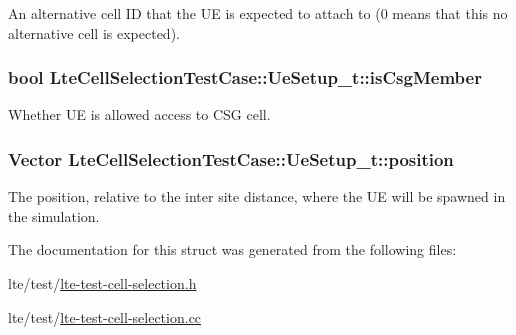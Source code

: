 An alternative cell ID that the UE is expected to attach to (0 means that this no alternative cell is expected). 

\subsubsection[{\texorpdfstring{is\+Csg\+Member}{isCsgMember}}]{\setlength{\rightskip}{0pt plus 5cm}bool Lte\+Cell\+Selection\+Test\+Case\+::\+Ue\+Setup\+\_\+t\+::is\+Csg\+Member}\hypertarget{structLteCellSelectionTestCase_1_1UeSetup__t_a86d14f555665658a506313e5e7613267}{}\label{structLteCellSelectionTestCase_1_1UeSetup__t_a86d14f555665658a506313e5e7613267}


Whether UE is allowed access to C\+SG cell. 

\subsubsection[{\texorpdfstring{position}{position}}]{\setlength{\rightskip}{0pt plus 5cm}Vector Lte\+Cell\+Selection\+Test\+Case\+::\+Ue\+Setup\+\_\+t\+::position}\hypertarget{structLteCellSelectionTestCase_1_1UeSetup__t_a022f57e5d3a6de3021110f2c646fe9fe}{}\label{structLteCellSelectionTestCase_1_1UeSetup__t_a022f57e5d3a6de3021110f2c646fe9fe}


The position, relative to the inter site distance, where the UE will be spawned in the simulation. 



The documentation for this struct was generated from the following files\+:\begin{DoxyCompactItemize}
\item 
lte/test/\hyperlink{lte-test-cell-selection_8h}{lte-\/test-\/cell-\/selection.\+h}\item 
lte/test/\hyperlink{lte-test-cell-selection_8cc}{lte-\/test-\/cell-\/selection.\+cc}\end{DoxyCompactItemize}
